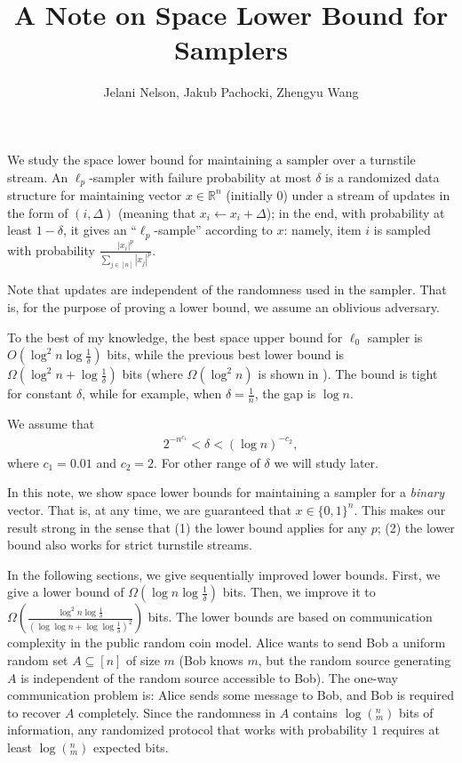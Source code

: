 \documentclass[10pt]{article}
\title{A Note on Space Lower Bound for Samplers}
\author{Jelani Nelson, Jakub Pachocki, Zhengyu Wang}
\begin{document}
	
\maketitle

We study the space lower bound for maintaining a sampler over a turnstile stream. An $\ell_p$-sampler with failure probability at most $\delta$ is a randomized data structure for maintaining vector $x\in \mathbb{R}^n$ (initially 0) under a stream of updates in the form of $(i, \Delta)$ (meaning that $x_i \leftarrow x_i+\Delta$); in the end, with probability at least $1-\delta$, it gives an ``$\ell_p$-sample'' according to $x$: namely, item $i$ is sampled with probability $\frac{|x_i|^p}{\sum_{j\in [n]}{|x_j|^p}}$. 

Note that updates are independent of the randomness used in the sampler. That is, for the purpose of proving a lower bound, we assume an oblivious adversary. 

To the best of my knowledge, the best space upper bound for $\ell_0$ sampler is $O(\log^2 n \log \frac{1}{\delta})$ bits, while the previous best lower bound is $\Omega(\log^2 n +\log\frac{1}{\delta})$ bits (where $\Omega(\log^2 n)$ is shown in \cite{jowhari2011tight}). The bound is tight for constant $\delta$, while for example, when $\delta=\frac{1}{n}$, the gap is $\log n$. 

We assume that 
\begin{align} \label{formula:delta-range}
2^{-n^{c_1}}<\delta<(\log n)^{-c_2},
\end{align}
where $c_1=0.01$ and $c_2=2$. For other range of $\delta$ we will study later.

In this note, we show space lower bounds for maintaining a sampler for a {\em binary} vector. That is, at any time, we are guaranteed that $x\in \{0,1\}^n$. This makes our result strong in the sense that (1) the lower bound applies for any $p$; (2) the lower bound also works for strict turnstile streams.

In the following sections, we give sequentially improved lower bounds. First, we give a lower bound of $\Omega(\log n \log \frac{1}{\delta})$ bits. Then, we improve it to $\Omega(\frac{\log^2 n \log \frac{1}{\delta}}{(\log\log n + \log\log \frac{1}{\delta})^2})$ bits. The lower bounds are based on communication complexity in the public random coin model. Alice wants to send Bob a uniform random set $A\subseteq [n]$ of size $m$ (Bob knows $m$, but the random source generating $A$ is independent of the random source accessible to Bob). The one-way communication problem is: Alice sends some message to Bob, and Bob is required to recover $A$ completely. Since the randomness in $A$ contains $\log (^n_m)$ bits of information, any randomized protocol that works with probability $1$ requires at least $\log (^n_m)$ expected bits. 
\end{document}
